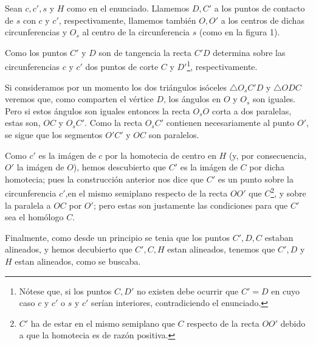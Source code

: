 	\begin{sol}
		Sean $c,c',s$ y $H$ como en el enunciado. Llamemos $D,C'$ a los puntos de contacto de $s$ con $c$ y $c'$, respectivamente, llamemos también $O,O'$ a los centros de dichas circunferencias y $O_s$ al centro de la circunferencia $s$ (como en la figura 1).
		
		Como los puntos $C'$ y $D$ son de tangencia la recta $C'D$ determina sobre las circunferencias $c$ y $c'$ dos puntos de corte $C$ y $D'$\footnote{Nótese que, si los puntos $C,D'$ no existen debe ocurrir que $C'=D$ en cuyo caso $c$ y $c'$ o $s$ y $c'$ serían interiores, contradiciendo el enunciado.}, respectivamente.
		
		Si consideramos por un momento los dos triángulos isóceles $\triangle O_sC'D$ y $\triangle ODC$ veremos que, como comparten el vértice $D$, los ángulos en $O$ y $O_s$ son iguales. Pero si estos ángulos son iguales entonces la recta $O_sO$ corta a dos paralelas, estas son, $OC$ y $O_sC'$. Como la recta $O_sC'$ contienen necesariamente al punto $O'$, se sigue que los segmentos $O'C'$ y $OC$ son paralelos.
		
		Como $c'$ es la imágen de $c$ por la homotecia de centro en $H$ (y, por consecuencia, $O'$ la imágen de $O$), hemos descubierto que $C'$ es la imágen de $C$ por dicha homotecia; pues la construcción anterior nos dice que $C'$ es un punto sobre la circunferencia $c'$,en el mismo semiplano respecto de la recta $OO'$ que $C$\footnote{$C'$ ha de estar en el mismo semiplano que $C$ respecto de la recta $OO'$ debido a que la homotecia es de razón positiva.}, y sobre la paralela a $OC$ por $O'$; pero estas son justamente las condiciones para que $C'$ sea el homólogo $C$.
		
		Finalmente, como desde un principio se tenia que los puntos $C',D,C$ estaban alineados, y hemos decubierto que $C',C,H$ estan alineados, tenemos que $C',D$ y $H$ estan alineados, como se buscaba.

	\end{sol}
